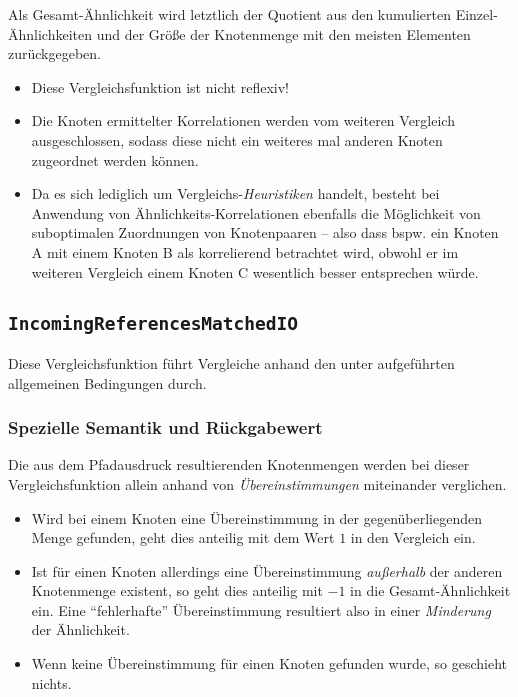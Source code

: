 Als Gesamt-Ähnlichkeit wird letztlich der Quotient aus den kumulierten Einzel-Ähnlichkeiten und der Größe der Knotenmenge mit den meisten Elementen zurückgegeben.

\begin{itemize}
	\item Diese Vergleichsfunktion ist nicht reflexiv!
	\item Die Knoten ermittelter Korrelationen werden vom weiteren Vergleich ausgeschlossen, sodass diese nicht ein weiteres mal anderen Knoten zugeordnet werden können.
	\item Da es sich lediglich um Vergleichs-\emph{Heuristiken} handelt, besteht bei Anwendung von Ähnlich\-keits-Korrelationen ebenfalls die Möglichkeit von suboptimalen Zuordnungen von Knotenpaaren -- also dass bspw. ein Knoten A mit einem Knoten B als korrelierend betrachtet wird, obwohl er im weiteren Vergleich einem Knoten C wesentlich besser entsprechen würde.
\end{itemize}


%
%
\subsection{\texttt{IncomingReferencesMatchedIO}}
Diese Vergleichsfunktion führt Vergleiche anhand den unter\mylinebreak{} aufgeführten allgemeinen Bedingungen durch.

\subsubsection*{Spezielle Semantik und Rückgabewert}
Die aus dem Pfadausdruck resultierenden Knotenmengen werden bei dieser Vergleichsfunktion allein anhand von \emph{Übereinstimmungen} miteinander verglichen.
\begin{itemize}
	\item Wird bei einem Knoten eine Übereinstimmung in der gegenüberliegenden Menge gefunden, geht dies anteilig mit dem Wert $1$ in den Vergleich ein.
	\item Ist für einen Knoten allerdings eine Übereinstimmung \emph{außerhalb} der anderen Knotenmenge existent, so geht dies anteilig mit $-1$ in die Gesamt-Ähnlichkeit ein. Eine "`fehlerhafte"' Übereinstimmung resultiert also in einer \emph{Minderung} der Ähnlichkeit.
	\item Wenn keine Übereinstimmung für einen Knoten gefunden wurde, so geschieht nichts.
\end{itemize}


